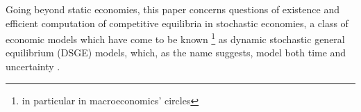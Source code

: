 
Going beyond static economies, this paper concerns questions of existence and efficient computation of competitive equilibria in stochastic economies, a class of economic models which have come to be known%
\footnote{in particular in macroeconomics' circles}
as dynamic stochastic general equilibrium (DSGE) models, which, as the name suggests, model both time and uncertainty .
\fi




